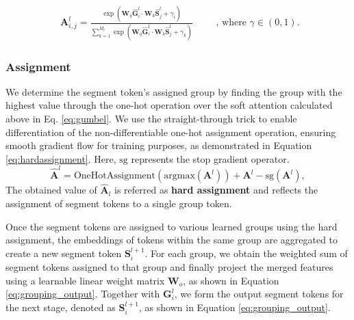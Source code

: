 \begin{equation}
\begin{aligned}
\label{eq:gumbel}
\textbf{A}^{l}_{i,j} = \frac{\exp(\textbf{W}_q\hat{\textbf{G}}_i^{l} \cdot \textbf{W}_k\hat{\textbf{S}}_j^{l} + \gamma_i)}{\sum_{k=1}^{M_l} \exp(\textbf{W}_q\hat{\textbf{G}}_i^{l} \cdot \textbf{W}_k\hat{\textbf{S}}_j^{l} + \gamma_k)}
\end{aligned}
\qquad
\text{, where $\gamma \in (0, 1)$.}
\end{equation}

\subsubsection{Assignment}
We determine the segment token's assigned group by finding the group with the highest value through the one-hot operation over the soft attention calculated above in Eq. \ref{eq:gumbel}. We use the straight-through trick \cite{van2017neural} to enable differentiation of the non-differentiable one-hot assignment operation, ensuring smooth gradient flow for training purposes, as demonstrated in Equation \ref{eq:hardassignment}. Here, $\text{sg}$ represents the stop gradient operator. 
\begin{equation}
\label{eq:hardassignment}
\hat{\textbf{A}}^l = \text{OneHotAssignment}(\text{argmax}(\textbf{A}^l)) + \textbf{A}^l - \text{sg}(\textbf{A}^l),
\end{equation}
The obtained value of $\hat{\textbf{A}}_l$ is referred as \textbf{hard assignment} and reflects the assignment of segment tokens to a single group token.

Once the segment tokens are assigned to various learned groups using the hard assignment, the embeddings of tokens within the same group are aggregated to create a new segment token $\mathbf{S}^{l+1}_{i}$. For each group, we obtain the weighted sum of segment tokens assigned to that group and finally project the merged features using a learnable linear weight matrix $\mathbf{W}_o$, as shown in Equation \ref{eq:grouping_output}. Together with $\mathbf{G}_i^{l}$, we form the output segment tokens for the next stage, denoted as $\mathbf{S}^{l+1}_{i}$, as shown in Equation \ref{eq:grouping_output}.

